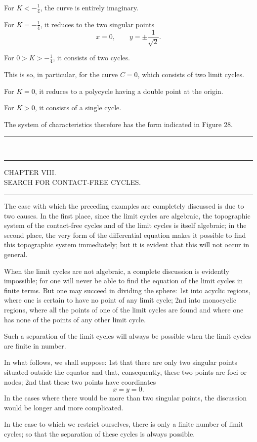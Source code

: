 \documentclass[11pt]{article}
\newcommand{\ornament}{\begin{center}\rule{2.5em}{0.4pt}\,\raisebox{0.1ex}{\tiny$\bullet\bullet\bullet$}\,\rule{2.5em}{0.4pt}\end{center}}
\newcommand{\shortline}{\begin{center}\rule{3.5em}{0.4pt}\end{center}}
\begin{document}
For $K<-\frac14$, the curve is entirely imaginary.

For $K=-\frac14$, it reduces to the two singular points
\[
x=0,\qquad y=\pm\frac1{\sqrt2}.
\]

For $0>K>-\frac14$, it consists of two cycles.

This is so, in particular, for the curve $C=0$, which consists of two limit cycles.

For $K=0$, it reduces to a polycycle having a double point at the origin.

For $K>0$, it consists of a single cycle.

The system of characteristics therefore has the form indicated in Figure 28.

\ornament

\begin{center}
{\Large CHAPTER VIII.}\\[0.4em]
{\small SEARCH FOR CONTACT-FREE CYCLES.}
\end{center}
\shortline

The ease with which the preceding examples are completely discussed is due to two causes. In the first place, since the limit cycles are algebraic, the topographic system of the contact-free cycles and of the limit cycles is itself algebraic; in the second place, the very form of the differential equation makes it possible to find this topographic system immediately; but it is evident that this will not occur in general.

When the limit cycles are not algebraic, a complete discussion is evidently impossible; for one will never be able to find the equation of the limit cycles in finite terms. But one may succeed in dividing the sphere: 1st into acyclic regions, where one is certain to have no point of any limit cycle; 2nd into monocyclic regions, where all the points of one of the limit cycles are found and where one has none of the points of any other limit cycle.

Such a separation of the limit cycles will always be possible when the limit cycles are finite in number.

In what follows, we shall suppose: 1st that there are only two singular points situated outside the equator and that, consequently, these two points are foci or nodes; 2nd that these two points have coordinates
\[
x=y=0.
\]
In the cases where there would be more than two singular points, the discussion would be longer and more complicated.

In the case to which we restrict ourselves, there is only a finite number of limit cycles; so that the separation of these cycles is always possible.
\end{document}
